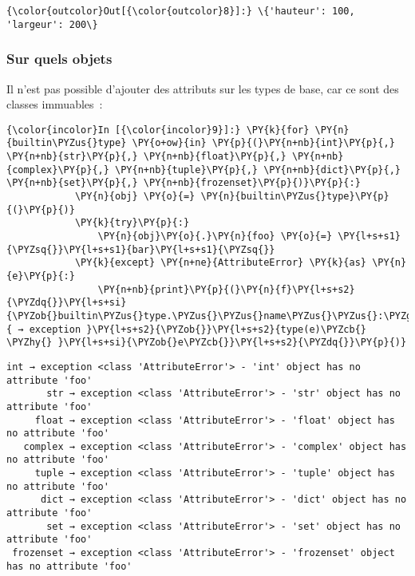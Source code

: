 \begin{Verbatim}[commandchars=\\\{\},frame=single,framerule=0.3mm,rulecolor=\color{cellframecolor}]
{\color{outcolor}Out[{\color{outcolor}8}]:} \{'hauteur': 100, 'largeur': 200\}
\end{Verbatim}
            
    \hypertarget{sur-quels-objets}{%
\subsubsection{Sur quels objets}\label{sur-quels-objets}}

    Il n'est pas possible d'ajouter des attributs sur les types de base, car
ce sont des classes immuables~:

    \begin{Verbatim}[commandchars=\\\{\},frame=single,framerule=0.3mm,rulecolor=\color{cellframecolor}]
{\color{incolor}In [{\color{incolor}9}]:} \PY{k}{for} \PY{n}{builtin\PYZus{}type} \PY{o+ow}{in} \PY{p}{(}\PY{n+nb}{int}\PY{p}{,} \PY{n+nb}{str}\PY{p}{,} \PY{n+nb}{float}\PY{p}{,} \PY{n+nb}{complex}\PY{p}{,} \PY{n+nb}{tuple}\PY{p}{,} \PY{n+nb}{dict}\PY{p}{,} \PY{n+nb}{set}\PY{p}{,} \PY{n+nb}{frozenset}\PY{p}{)}\PY{p}{:}
            \PY{n}{obj} \PY{o}{=} \PY{n}{builtin\PYZus{}type}\PY{p}{(}\PY{p}{)}
            \PY{k}{try}\PY{p}{:} 
                \PY{n}{obj}\PY{o}{.}\PY{n}{foo} \PY{o}{=} \PY{l+s+s1}{\PYZsq{}}\PY{l+s+s1}{bar}\PY{l+s+s1}{\PYZsq{}}
            \PY{k}{except} \PY{n+ne}{AttributeError} \PY{k}{as} \PY{n}{e}\PY{p}{:} 
                \PY{n+nb}{print}\PY{p}{(}\PY{n}{f}\PY{l+s+s2}{\PYZdq{}}\PY{l+s+si}{\PYZob{}builtin\PYZus{}type.\PYZus{}\PYZus{}name\PYZus{}\PYZus{}:\PYZgt{}10\PYZcb{}}\PY{l+s+s2}{ → exception }\PY{l+s+s2}{\PYZob{}}\PY{l+s+s2}{type(e)\PYZcb{} \PYZhy{} }\PY{l+s+si}{\PYZob{}e\PYZcb{}}\PY{l+s+s2}{\PYZdq{}}\PY{p}{)}
\end{Verbatim}


    \begin{Verbatim}[commandchars=\\\{\},frame=single,framerule=0.3mm,rulecolor=\color{cellframecolor}]
       int → exception <class 'AttributeError'> - 'int' object has no attribute 'foo'
       str → exception <class 'AttributeError'> - 'str' object has no attribute 'foo'
     float → exception <class 'AttributeError'> - 'float' object has no attribute 'foo'
   complex → exception <class 'AttributeError'> - 'complex' object has no attribute 'foo'
     tuple → exception <class 'AttributeError'> - 'tuple' object has no attribute 'foo'
      dict → exception <class 'AttributeError'> - 'dict' object has no attribute 'foo'
       set → exception <class 'AttributeError'> - 'set' object has no attribute 'foo'
 frozenset → exception <class 'AttributeError'> - 'frozenset' object has no attribute 'foo'
\end{Verbatim}

